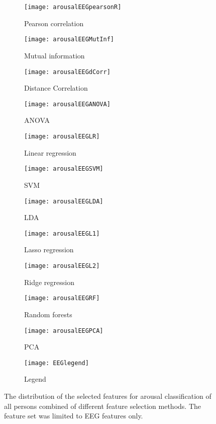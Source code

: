 \clearpage
\begin{figure}[!tbp]
  \centering
  \begin{subfigure}[b]{0.3\textwidth}
    \texttt{[image: arousalEEGpearsonR]}
    \caption{Pearson correlation}
  \end{subfigure}
  \hfill
  \begin{subfigure}[b]{0.3\textwidth}
    \texttt{[image: arousalEEGMutInf]}
    \caption{Mutual information}
  \end{subfigure}
  \hfill
  \begin{subfigure}[b]{0.3\textwidth}
    \texttt{[image: arousalEEGdCorr]}
    \caption{Distance Correlation}
  \end{subfigure}
  
  \begin{subfigure}[b]{0.3\textwidth}
    \texttt{[image: arousalEEGANOVA]}
    \caption{ANOVA}
  \end{subfigure}
  \hfill
  \begin{subfigure}[b]{0.3\textwidth}
    \texttt{[image: arousalEEGLR]}
    \caption{Linear regression}
  \end{subfigure}
  \hfill
  \begin{subfigure}[b]{0.3\textwidth}
    \texttt{[image: arousalEEGSVM]}
    \caption{SVM}
  \end{subfigure}
  
  \begin{subfigure}[b]{0.3\textwidth}
    \texttt{[image: arousalEEGLDA]}
    \caption{LDA}
  \end{subfigure}
  \hfill
  \begin{subfigure}[b]{0.3\textwidth}
    \texttt{[image: arousalEEGL1]}
    \caption{Lasso regression}
  \end{subfigure}
  \hfill
  \begin{subfigure}[b]{0.3\textwidth}
    \texttt{[image: arousalEEGL2]}
    \caption{Ridge regression}
  \end{subfigure}
  
  \begin{subfigure}[b]{0.3\textwidth}
    \texttt{[image: arousalEEGRF]}
    \caption{Random forests}
  \end{subfigure}
  \hfill
  \begin{subfigure}[b]{0.3\textwidth}
    \texttt{[image: arousalEEGPCA]}
    \caption{PCA}
  \end{subfigure}
  \hfill
  \begin{subfigure}[b]{0.3\textwidth}
    \texttt{[image: EEGlegend]}
    \caption{Legend\label{arousalpiesEEGlegend}}
  \end{subfigure}
\caption{The distribution of the selected features for arousal classification of all persons combined of different feature selection methods. The feature set was limited to EEG features only.\label{arousalEEGpies}}
\end{figure}

